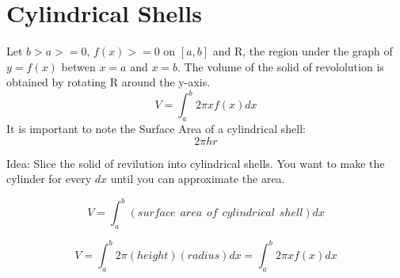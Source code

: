 \documentclass[12pt, letterpaper]{article}
\begin{document}
    \section*{Cylindrical Shells}
        Let $b > a >= 0$, $ f(x) >= 0$ on $[a, b]$ and R, the region under the graph of $y = f(x)$ betwen $x = a$ and $x = b$. The volume of the solid of revololution is obtained by rotating R around the y-axis. 
        \begin{equation}
            V = \int^b_a 2\pi x f(x) dx
        \end{equation}
        It is important to note the Surface Area of a cylindrical shell:
        \begin{equation*}
            2\pi h r
        \end{equation*}

        Idea: Slice the solid of revilution into cylindrical shells. You want to make the cylinder for every $dx$ until you can approximate the area.

        \begin{equation*}
            V = \int^b_a \left(surface \hspace{5pt} area\hspace{5pt}  of \hspace{5pt}  cylindrical\hspace{5pt} shell \right) dx
        \end{equation*}

        \begin{equation*}
            V = \int^b_a 2\pi \left( height\right) \left( radius\right) dx = \int^b_a 2\pi x f(x) dx
        \end{equation*}
        
\end{document}
